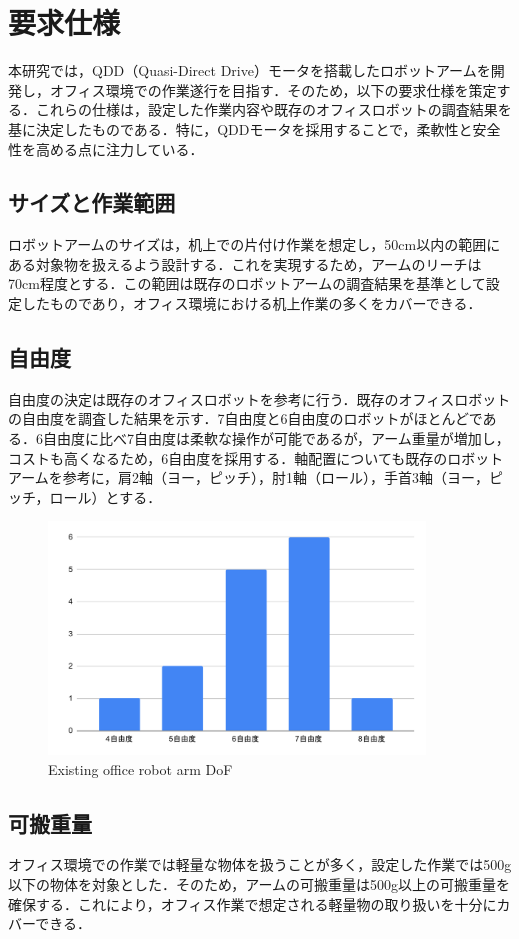 \section{要求仕様}
本研究では，QDD（Quasi-Direct Drive）モータを搭載したロボットアームを開発し，オフィス環境での作業遂行を目指す．そのため，以下の要求仕様を策定する．これらの仕様は，設定した作業内容や既存のオフィスロボットの調査結果を基に決定したものである．特に，QDDモータを採用することで，柔軟性と安全性を高める点に注力している．

\subsection{サイズと作業範囲}
ロボットアームのサイズは，机上での片付け作業を想定し，50cm以内の範囲にある対象物を扱えるよう設計する．これを実現するため，アームのリーチは70cm程度とする．この範囲は既存のロボットアームの調査結果を基準として設定したものであり，オフィス環境における机上作業の多くをカバーできる．

\subsection{自由度}
自由度の決定は既存のオフィスロボットを参考に行う．既存のオフィスロボットの自由度を調査した結果を示す．7自由度と6自由度のロボットがほとんどである．6自由度に比べ7自由度は柔軟な操作が可能であるが，アーム重量が増加し，コストも高くなるため，6自由度を採用する．軸配置についても既存のロボットアームを参考に，肩2軸（ヨー，ピッチ），肘1軸（ロール），手首3軸（ヨー，ピッチ，ロール）とする．

\begin{figure}[h]
  \centering
  \includegraphics[width=10cm]{images/armDof.pdf}
  \caption{Existing office robot arm DoF}
  \label{fig:armDof}
\end{figure}

\subsection{可搬重量}
オフィス環境での作業では軽量な物体を扱うことが多く，設定した作業では500g以下の物体を対象とした．そのため，アームの可搬重量は500g以上の可搬重量を確保する．これにより，オフィス作業で想定される軽量物の取り扱いを十分にカバーできる．

